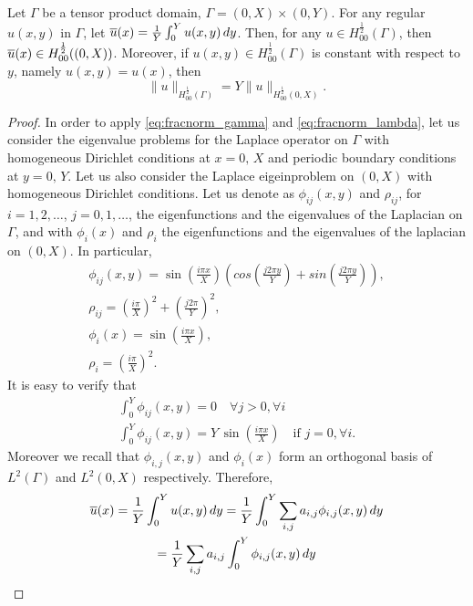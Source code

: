 \documentclass[r]{siamart171218}
\begin{document}
\begin{lemma}\label{lemma:H12norm}
Let $\Gamma$ be a tensor product domain, $\Gamma= (0,X) \times (0,Y)$. For any regular $u(x,y)$ in $\Gamma$, let $\overline{u}(x)=\frac 1Y \int _0^Y u(x,y)\, dy$. Then, for any $u\in H_{00}^{\frac 12}(\Gamma)$, then $\overline{u}(x)\in H_{00}^{\frac 12}((0,X))$. 
Moreover, if $u(x,y)\in H^{\frac 12}_{00}(\Gamma)$ is constant with respect to $y$, namely $u(x,y)=u(x)$, then 
\begin{equation*}
\|u\|_{H^{\frac 12}_{00}(\Gamma)}=Y \|u\|_{H^{\frac 12}_{00}(0,X)}.
\end{equation*}
\end{lemma}
\begin{proof}
In order to apply \eqref{eq:fracnorm_gamma} and \eqref{eq:fracnorm_lambda}, let us consider the eigenvalue problems for the Laplace operator on $\Gamma$ with homogeneous Dirichlet conditions at $x=0,\, X$ and periodic boundary conditions at $y=0,\, Y$. Let us also consider the Laplace eigeinproblem on $(0,X)$ with homogeneous Dirichlet conditions. Let us denote as $\phi _{ij}(x,y)$ and $\rho _{ij}$, for $i=1,2,\dots$, $j=0,1,\dots$, the eigenfunctions and the eigenvalues of the Laplacian on $\Gamma$, and with $\phi _i(x)$ and $\rho _i$ the eigenfunctions and the eigenvalues of the laplacian on $(0,X)$. In particular,
\begin{align*}
\phi _{ij}(x,y)=\sin \left(\frac{i\pi x}{X}\right)\left( cos\left(\frac{j2\pi y}{Y}\right)+ sin	\left(\frac{j2\pi y}{Y}\right) \right),\\
\rho_{ij}=\left(\frac{i\pi}{X}\right) ^2+\left(\frac{j2\pi}{Y}\right)^2,\\
\phi _{i}(x)=\sin \left(\frac{i\pi x}{X}\right),\\
\rho _i = \left(\frac{i\pi}{X}\right) ^2.
\end{align*}
It is easy to verify that 
\begin{eqnarray}
\label{null_int_eigenf}
\int_0^{Y} \phi _{ij}(x,y)=0 \quad \forall j>0, \forall i \\
\label{nonull_int_eigenf}
\int_0^{Y} \phi _{ij}(x,y)= Y \, \sin\left(\frac{i\pi x}{X}\right) \quad \mbox{if } j=0, \forall i  .
\end{eqnarray}
Moreover we recall that $\phi_{i,j}(x,y)$ and $\phi _i(x)$ form an orthogonal basis of $L^2(\Gamma)$ and $L^2(0,X)$ respectively. Therefore,
\begin{multline*}
\avrc{u}(x)=\frac{1}{Y}\int_0^{Y} u(x,y)\, dy
= \frac{1}{Y}\int_0^{Y} \sum_{i,j} a_{i,j} \phi_{i,j}(x,y) \, dy
\\= \frac{1}{Y}\sum_{i,j} a_{i,j}\int_0^{Y}  \phi_{i,j}(x,y) \, dy

\end{multline*}
\end{proof}
\end{document}
